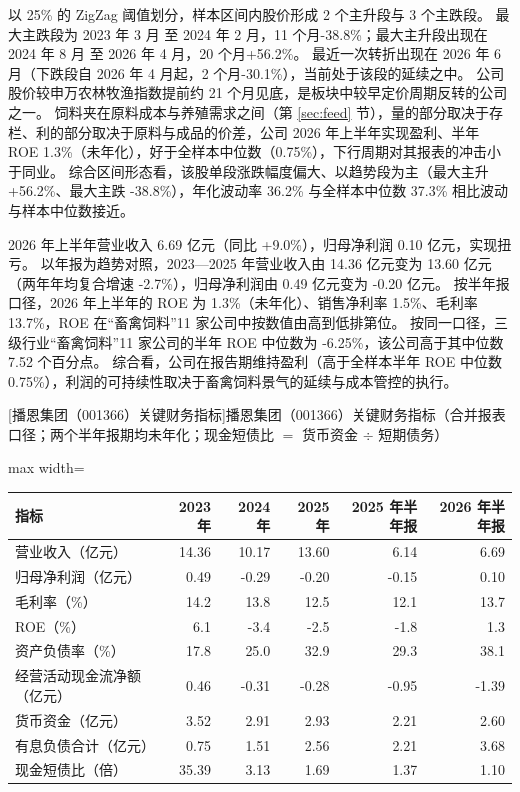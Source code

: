  以 25\% 的 ZigZag 阈值划分，样本区间内股价形成 2 个主升段与 3 个主跌段。 最大主跌段为 2023 年 3 月 至 2024 年 2 月，11 个月-38.8\%；最大主升段出现在 2024 年 8 月 至 2026 年 4 月，20 个月+56.2\%。 最近一次转折出现在 2026 年 6 月（下跌段自 2026 年 4 月起，2 个月-30.1\%），当前处于该段的延续之中。 公司股价较申万农林牧渔指数提前约 21 个月见底，是板块中较早定价周期反转的公司之一。 饲料夹在原料成本与养殖需求之间（第 \ref{sec:feed} 节），量的部分取决于存栏、利的部分取决于原料与成品的价差，公司 2026 年上半年实现盈利、半年 ROE 1.3\%（未年化），好于全样本中位数（0.75\%），下行周期对其报表的冲击小于同业。 综合区间形态看，该股单段涨跌幅度偏大、以趋势段为主（最大主升 +56.2\%、最大主跌 -38.8\%），年化波动率 36.2\% 与全样本中位数 37.3\% 相比波动与样本中位数接近。

 2026 年上半年营业收入 6.69 亿元（同比 +9.0\%），归母净利润 0.10 亿元，实现扭亏。 以年报为趋势对照，2023---2025 年营业收入由 14.36 亿元变为 13.60 亿元（两年年均复合增速 -2.7\%），归母净利润由 0.49 亿元变为 -0.20 亿元。 按半年报口径，2026 年上半年的 ROE 为 1.3\%（未年化）、销售净利率 1.5\%、毛利率 13.7\%，ROE 在“畜禽饲料”11 家公司中按数值由高到低排第位。 按同一口径，三级行业“畜禽饲料”11 家公司的半年 ROE 中位数为 -6.25\%，该公司高于其中位数 7.52 个百分点。 综合看，公司在报告期维持盈利（高于全样本半年 ROE 中位数 0.75\%），利润的可持续性取决于畜禽饲料景气的延续与成本管控的执行。

\begin{center}\small\setlength{\tabcolsep}{3.4pt}
[播恩集团（001366）关键财务指标]{播恩集团（001366）关键财务指标（合并报表口径；两个半年报期均未年化；现金短债比 $=$ 货币资金 $\div$ 短期债务）}
\begin{adjustbox}{max width=\textwidth}
\begin{tabular}{@{}lrrrrr@{}}
\toprule
指标 & 2023 年 & 2024 年 & 2025 年 & 2025 年半年报 & 2026 年半年报 \\
\midrule
营业收入（亿元） & 14.36 & 10.17 & 13.60 & 6.14 & 6.69 \\
归母净利润（亿元） & 0.49 & -0.29 & -0.20 & -0.15 & 0.10 \\
毛利率（\%） & 14.2 & 13.8 & 12.5 & 12.1 & 13.7 \\
ROE（\%） & 6.1 & -3.4 & -2.5 & -1.8 & 1.3 \\
资产负债率（\%） & 17.8 & 25.0 & 32.9 & 29.3 & 38.1 \\
经营活动现金流净额（亿元） & 0.46 & -0.31 & -0.28 & -0.95 & -1.39 \\
货币资金（亿元） & 3.52 & 2.91 & 2.93 & 2.21 & 2.60 \\
有息负债合计（亿元） & 0.75 & 1.51 & 2.56 & 2.21 & 3.68 \\
现金短债比（倍） & 35.39 & 3.13 & 1.69 & 1.37 & 1.10 \\
\bottomrule
\end{tabular}
\end{adjustbox}
\end{center}

